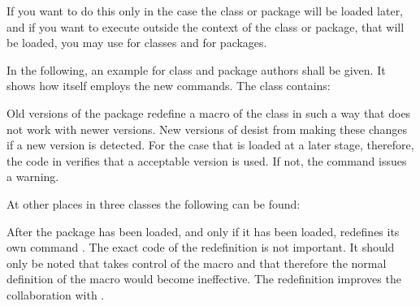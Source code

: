 If you
want to do this only in the case the class or package will be loaded later,
and if you want to execute  outside the context of the
class or package, that will be loaded, you may use
 for classes and
 for packages.

\begin{Example}
  In the following, an example for class and package authors shall be
  given.  It shows how {\KOMAScript} itself employs the new commands.
  The class  contains:
\begin{lstcode}
\end{lstcode}
  Old versions of the  package redefine a macro of the
   class in such a way that does not work with newer
  {\KOMAScript} versions.  New versions of  desist
  from making these changes if a new {\KOMAScript} version is detected.
  For the case that  is loaded at a later stage,
  therefore, the code in  verifies that a acceptable
   version is used.  If not, the command issues a
  warning.

  At other places in three {\KOMAScript} classes the following can be
  found:
\begin{lstcode}
  \AfterPackage{caption2}{%
    \renewcommand*{\setcapindent}{%
\end{lstcode}
  After the package  has been loaded, and only if it
  has been loaded, {\KOMAScript} redefines its own command
  .  The exact code of the redefinition is
  not important.  It should only be noted that  takes
  control of the  macro and that therefore the
  normal definition of the  macro would
  become ineffective. The redefinition improves the collaboration with
  .


\end{Example}
